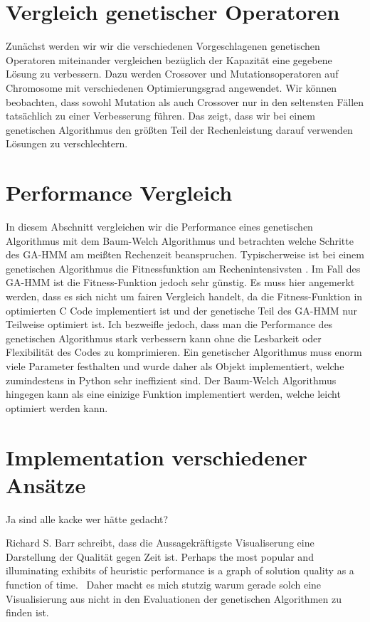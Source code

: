 \section*{Vergleich genetischer Operatoren}
Zunächst werden wir wir die verschiedenen Vorgeschlagenen genetischen Operatoren miteinander vergleichen bezüglich der Kapazität eine gegebene Lösung zu verbessern. Dazu werden Crossover und Mutationsoperatoren auf Chromosome mit verschiedenen Optimierungsgrad angewendet. Wir können beobachten, dass sowohl Mutation als auch Crossover nur in den seltensten Fällen tatsächlich zu einer Verbesserung führen. Das zeigt, dass wir bei einem genetischen Algorithmus den größten Teil der Rechenleistung darauf verwenden Lösungen zu verschlechtern.

\section*{Performance Vergleich}
In diesem Abschnitt vergleichen wir die Performance eines genetischen Algorithmus mit dem Baum-Welch Algorithmus und betrachten welche Schritte des GA-HMM am meißten Rechenzeit beanspruchen. Typischerweise ist bei einem genetischen Algorithmus die Fitnessfunktion am Rechenintensivsten \cite*{MetaheuristicsEGT}. Im Fall des GA-HMM ist die Fitness-Funktion jedoch sehr günstig. Es muss hier angemerkt werden, dass es sich nicht um fairen Vergleich handelt, da die Fitness-Funktion in optimierten C Code implementiert ist und der genetische Teil des GA-HMM nur Teilweise optimiert ist. Ich bezweifle jedoch, dass man die Performance des genetischen Algorithmus stark verbessern kann ohne die Lesbarkeit oder Flexibilität des Codes zu komprimieren. Ein genetischer Algorithmus muss enorm viele Parameter festhalten und wurde daher als Objekt implementiert, welche zumindestens in Python sehr ineffizient sind. Der Baum-Welch Algorithmus hingegen kann als eine einizige Funktion implementiert werden, welche leicht optimiert werden kann. 

\section*{Implementation verschiedener Ansätze}
Ja sind alle kacke wer hätte gedacht?

Richard S. Barr schreibt, dass die Aussagekräftigste Visualiserung eine Darstellung der Qualität gegen Zeit ist.
Perhaps the most popular and illuminating exhibits of heuristic performance is a graph 
of solution quality as a function of time.~\cite*{ComparisonGuidelines}
Daher macht es mich stutzig warum gerade solch eine Visualisierung aus nicht in den Evaluationen der genetischen Algorithmen zu finden ist.


